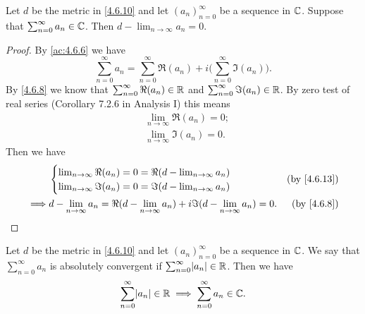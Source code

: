 \begin{ac}\label{ac:4.6.7}
  Let \(d\) be the metric in \cref{4.6.10} and let \((a_n)_{n = 0}^\infty\) be a sequence in \(\mathbb{C}\).
  Suppose that \(\sum_{n = 0}^\infty a_n \in \mathbb{C}\).
  Then \(d - \lim_{n \to \infty} a_n = 0\).
\end{ac}

\begin{proof}
  By \cref{ac:4.6.6} we have
  \[
    \sum_{n = 0}^\infty a_n = \sum_{n = 0}^\infty \Re(a_n) + i \bigg(\sum_{n = 0}^\infty \Im(a_n)\bigg).
  \]
  By \cref{4.6.8} we know that \(\sum_{n = 0}^\infty \Re(a_n) \in \mathbb{R}\) and \(\sum_{n = 0}^\infty \Im(a_n) \in \mathbb{R}\).
  By zero test of real series (Corollary 7.2.6 in Analysis I) this means
  \begin{align*}
     & \lim_{n \to \infty} \Re(a_n) = 0; \\
     & \lim_{n \to \infty} \Im(a_n) = 0.
  \end{align*}
  Then we have
  \begin{align*}
             & \begin{cases}
                 \lim_{n \to \infty} \Re(a_n) = 0 = \Re(d - \lim_{n \to \infty} a_n) \\
                 \lim_{n \to \infty} \Im(a_n) = 0 = \Im(d - \lim_{n \to \infty} a_n)
               \end{cases}                                   & \text{(by \cref{4.6.13})}                                                           \\
    \implies & d - \lim_{n \to \infty} a_n = \Re(d - \lim_{n \to \infty} a_n) + i \Im(d - \lim_{n \to \infty} a_n) = 0. & \text{(by \cref{4.6.8})}
  \end{align*}
\end{proof}

\begin{ac}\label{ac:4.6.8}
  Let \(d\) be the metric in \cref{4.6.10} and let \((a_n)_{n = 0}^\infty\) be a sequence in \(\mathbb{C}\).
  We say that \(\sum_{n = 0}^\infty a_n\) is absolutely convergent if \(\sum_{n = 0}^\infty \abs{a_n} \in \R\).
  Then we have
  \[
    \sum_{n = 0}^\infty \abs{a_n} \in \R \implies \sum_{n = 0}^\infty a_n \in \C.
  \]
\end{ac}

